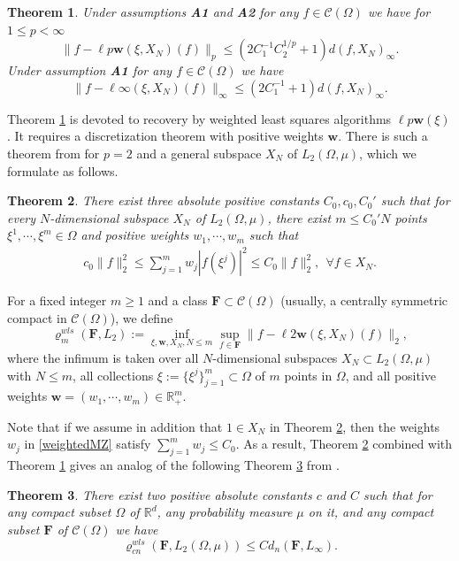 \documentclass[12pt]{article}
\def\C{{\mathcal C}}
\def\R{{\mathbb R}}
\def\Og{\Omega}
\def \ro{\varrho}
\def\bw{\mathbf w}
\def\bF{\mathbf F}
\def\Og{\Omega}
\newtheorem{Theorem}{Theorem}[section]
\numberwithin{equation}{section}
\begin{document}
\begin{Theorem}\label{srT2} Under assumptions {\bf A1} and {\bf A2} for any $f\in \C(\Omega)$ we have
for $1\le p<\infty$
$$
\|f-\ell p\bw(\xi,X_N)(f)\|_p \le (2C_1^{-1}C_2^{1/p} +1)d(f, X_N)_\infty.
$$
Under assumption {\bf A1} for any $f\in \C(\Omega)$ we have
$$
\|f-\ell \infty(\xi,X_N)(f)\|_\infty \le (2C_1^{-1}  +1)d(f, X_N)_\infty.
$$
\end{Theorem}

Theorem \ref{srT2} is devoted to recovery by weighted least squares algorithms $\ell p \bw(\xi)$.
 It requires a discretization theorem
with positive  weights $\bw $. There is such a theorem   from \cite{LT}
for  $p=2$ and a general  subspace $X_N$ of $L_2(\Og, \mu)$, which we formulate as follows.



\begin{Theorem} \label{thm-4-3} There exist three absolute positive  constants $C_0, c_0, C_0'$ such that for every $N$-dimensional subspace $X_N$ of $L_2(\Og, \mu)$, there exist $m\leq C_0' N$ points $\xi^1,\cdots, \xi^m\in\Og$ and positive weights $w_1,\cdots, w_m$ such that 
	\begin{align}\label{weightedMZ}
	c_0	\|f\|_{2}^2 \leq   \sum_{j=1}^mw_j |f(\xi^j)|^2\leq  C_0 \|f\|_2^2,\   \  \forall f\in X_N.
	\end{align}	
\end{Theorem}




For a fixed integer $m\ge 1$ and a class $\bF\subset \C(\Omega)$ (usually, a centrally symmetric compact in $\C(\Omega)$), we define 
$$
\varrho_m^{wls}(\bF,L_2) := \inf_{\xi,\bw,  X_N, N\leq m}\sup_{f\in \bF} \|f-\ell 2 \bw(\xi,X_N)(f)\|_2,
$$
where the infimum  is  taken over  all  $N$-dimensional subspaces $X_N\subset L_2(\Og, \mu)$ with $N\leq m$, all collections $\xi:=\{\xi^j\}_{j=1}^m\subset \Omega$ of $m$ 
points in $\Og$,  and all positive weights $\bw=(w_1,\cdots, w_m) \in\mathbb{R}_+^m$.




Note that if we assume in addition that $1\in X_N$ in Theorem \ref{thm-4-3},  then the weights $w_j$ in \eqref{weightedMZ} satisfy 
$\sum_{j=1}^m w_j \leq C_0$. As a result, Theorem \ref{thm-4-3} combined with Theorem \ref{srT2} gives an analog of the following  Theorem \ref{IT2} from \cite{VT183}. 
\begin{Theorem}\label{IT2} There exist two positive absolute constants $c$ and $C$ such that for any   compact subset $\Omega$  of $\R^d$, any probability measure $\mu$ on it, and any compact subset $\bF$ of $\C(\Omega)$ we have
	$$
	\ro_{cn}^{wls}(\bF,L_2(\Omega,\mu)) \le Cd_n(\bF,L_\infty).
	$$
\end{Theorem}
\end{document}
